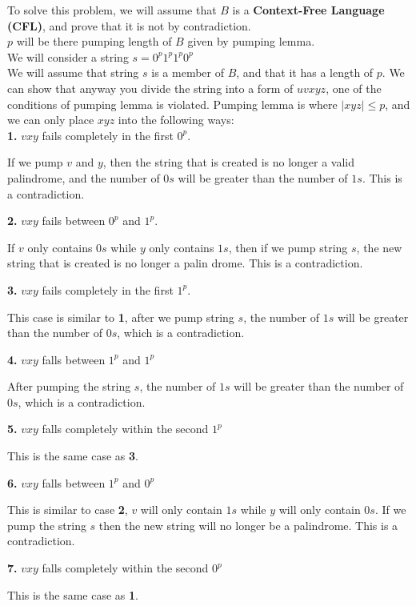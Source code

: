 \documentclass[12pt]{article}
\begin{document}
To solve this problem, we will assume that $B$ is a \textbf{Context-Free Language (CFL)},
and prove that it is not by contradiction. \\ 

$p$ will be there pumping length of $B$ given by pumping lemma. \\
We will consider a string $s = 0^p 1^p 1^p 0^p$ \\

We will assume that string $s$ is a member of $B$, and that it has
a length of $p$. We can show that anyway you divide the string into
a form of $uvxyz$, one of the conditions of pumping lemma is violated.
Pumping lemma is where $|xyz| \le p$, and we can only place $xyz$ into
the following ways: \\

\textbf{1.} $vxy$ fails completely in the first $0^p$.

If we pump $v$ and $y$, then the string that is created is no
longer a valid palindrome, and the number of $0s$ will be greater
than the number of $1s$. This is a contradiction.
	
\textbf{2.} $vxy$ fails between $0^p$ and $1^p$.

If $v$ only contains $0s$ while $y$ only contains $1s$, then
if we pump string $s$, the new string that is created is no
longer a palin drome. This is a contradiction.
	
\textbf{3.} $vxy$ fails completely in the first $1^p$.

This case is similar to \textbf{1}, after we pump string $s$,
the number of $1s$ will be greater than the number of $0s$,
which is a contradiction.

\textbf{4.} $vxy$ falls between $1^p$ and $1^p$

After pumping the string $s$, the number of $1s$ will be greater
than the number of $0s$, which is a contradiction.

\textbf{5.} $vxy$ falls completely within the second $1^p$

This is the same case as \textbf{3}.

\textbf{6.} $vxy$ falls between $1^p$ and $0^p$

This is similar to case \textbf{2}, $v$ will only contain
$1s$ while $y$ will only contain $0s$. If we pump the string
$s$ then the new string will no longer be a palindrome.
This is a contradiction.

\textbf{7.} $vxy$ falls completely within the second $0^p$

This is the same case as \textbf{1}. \\
\end{document}
